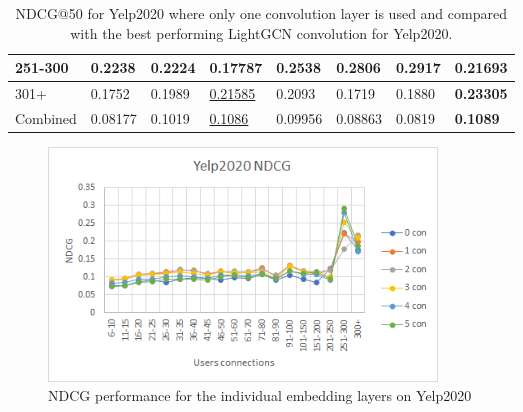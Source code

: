 \begin{table}[]
\begin{tabular}{|l|l|l|l|l|l|l||l|}
        251-300     & 0.2238                         & 0.2224                         & 0.17787                        & 0.2538                         & 0.2806                         & \textbf{0.2917}                 & 0.21693                    \\ \hline
        301+        & 0.1752                         & 0.1989                         & \underline{0.21585}            & 0.2093                         & 0.1719                         & 0.1880                          & \textbf{0.23305}           \\ \hline
        Combined    & 0.08177                        & 0.1019                         & \underline{0.1086}             & 0.09956                        & 0.08863                        & 0.0819                          & \textbf{0.1089}            \\ \hline
    \end{tabular}
    \caption{NDCG@50 for Yelp2020 where only one convolution layer is used and compared with the best performing LightGCN convolution for Yelp2020.}
    \label{tab:yelp2020-ndcg-evaluation}
\end{table}

\begin{figure}[]
    \includegraphics[width=0.5\textwidth]{figures/evaluation/yelp-ndcg-evaluation.png}
    \centering
    \caption{NDCG performance for the individual embedding layers on Yelp2020}
    \label{fig:yelp2020-ndcg-individual-evaluation}
\end{figure}

